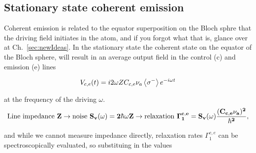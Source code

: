  
 \subsection{Stationary state coherent emission}	
  Coherent emission is related to the equator superposition on the Bloch sphre that the driving field initiates in the atom, and if you forgot what that is, glance over at Ch.~\ref{sec:newIdeas}. In the stationary state the coherent state on the equator of the Bloch sphere, will result in an average output field in the control (c) and emission (e) lines 
	
	 \[V_{c,e}(t)= i2\omega Z{C_{c,e}}\nu_a\left\langle \sigma^{-} \right\rangle e^{-i\omega t}\] 
	 
	 \noindent \alert{at the frequency of the driving $ \omega $.}
 \[
 	\text{Line impedance } \mathbf{Z} \rightarrow \text{noise } \mathbf{S_v(\omega) = 2\hbar\omega Z} \rightarrow \text{relaxation } \mathbf{\Gamma_1^{c,e} = S_v(\omega) \frac{(C_{c,e}\nu_a)^{2}}{\hbar^2}},
 \]
 
 \noindent and while we cannot measure impedance directly, relaxation rates $ \Gamma_1^{c,e} $ can be spectroscopically evaluated, so substituing in the values
 
